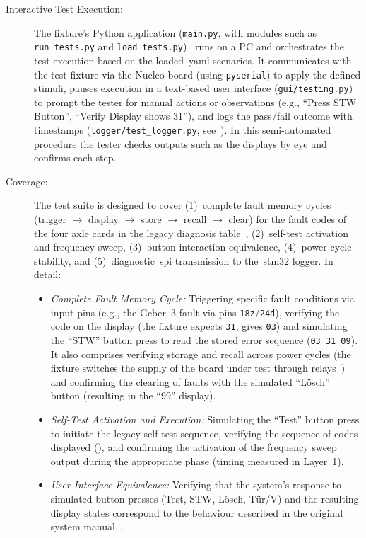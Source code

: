\begin{description}
	\item[Interactive Test Execution:] The fixture's Python application (\texttt{main.py}, with modules such as \texttt{run\_tests.py} and \texttt{load\_tests.py})~\cite{dolata2023} runs on a PC and orchestrates the test execution based on the loaded~\gls{yaml} scenarios. It communicates with the test fixture via the Nucleo board (using \texttt{pyserial}) to apply the defined stimuli, pauses execution in a text-based user interface (\texttt{gui/testing.py}) to prompt the tester for manual actions or observations (e.g., \enquote{Press STW Button}, \enquote{Verify Display shows 31}), and logs the pass/fail outcome with timestamps (\texttt{logger/test\_logger.py}, see~). In this semi-automated procedure the tester checks outputs such as the displays by eye and confirms each step.
	\item[Coverage:] The test suite is designed to cover (1)~complete fault memory cycles (trigger $\rightarrow$ display $\rightarrow$ store $\rightarrow$ recall $\rightarrow$ clear) for the fault codes of the four axle cards in the legacy diagnosis table~\cite[Blatt~20/25]{rexroth1992wsp}, (2)~self-test activation and frequency sweep, (3)~button interaction equivalence, (4)~power-cycle stability, and (5)~diagnostic~\gls{spi} transmission to the~\gls{stm32} logger. In detail:
	      \begin{itemize}
		      \item \textit{Complete Fault Memory Cycle:} Triggering specific fault conditions via input pins (e.g., the Geber~3 fault via pins \texttt{18z}/\texttt{24d}), verifying the code on the display (the fixture expects \texttt{31},  gives \texttt{03}) and simulating the \enquote{STW} button press to read the stored error sequence (\texttt{03~31~09}). It also comprises verifying storage and recall across power cycles (the fixture switches the supply of the board under test through relays~\cite{dolata2023}) and confirming the clearing of faults with the simulated \enquote{Lösch} button (resulting in the \enquote{99} display).
		      \item \textit{Self-Test Activation and Execution:} Simulating the \enquote{Test} button press to initiate the legacy self-test sequence, verifying the sequence of codes displayed (), and confirming the activation of the frequency sweep output during the appropriate phase (timing measured in Layer~1).
		      \item \textit{User Interface Equivalence:} Verifying that the system's response to simulated button presses (Test, STW, Lösch, Tür/V) and the resulting display states correspond to the behaviour described in the original system manual~\cite{rexroth1992wsp}.

\end{itemize}
\end{description}
